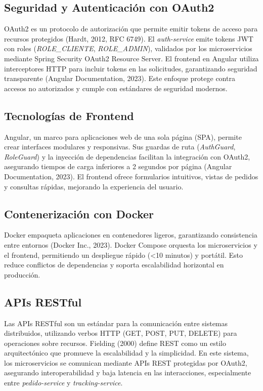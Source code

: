 \documentclass[a4paper,12pt]{article}
\begin{document}
\subsection{Seguridad y Autenticación con OAuth2}
OAuth2 es un protocolo de autorización que permite emitir tokens de acceso para recursos protegidos (Hardt, 2012, RFC 6749). El \textit{auth-service} emite tokens JWT con roles (\textit{ROLE\_CLIENTE}, \textit{ROLE\_ADMIN}), validados por los microservicios mediante Spring Security OAuth2 Resource Server. El frontend en Angular utiliza interceptores HTTP para incluir tokens en las solicitudes, garantizando seguridad transparente (Angular Documentation, 2023). Este enfoque protege contra accesos no autorizados y cumple con estándares de seguridad modernos.

\subsection{Tecnologías de Frontend}
Angular, un marco para aplicaciones web de una sola página (SPA), permite crear interfaces modulares y responsivas. Sus guardas de ruta (\textit{AuthGuard}, \textit{RoleGuard}) y la inyección de dependencias facilitan la integración con OAuth2, asegurando tiempos de carga inferiores a 2 segundos por página (Angular Documentation, 2023). El frontend ofrece formularios intuitivos, vistas de pedidos y consultas rápidas, mejorando la experiencia del usuario.

\subsection{Contenerización con Docker}
Docker empaqueta aplicaciones en contenedores ligeros, garantizando consistencia entre entornos (Docker Inc., 2023). Docker Compose orquesta los microservicios y el frontend, permitiendo un despliegue rápido (<10 minutos) y portátil. Esto reduce conflictos de dependencias y soporta escalabilidad horizontal en producción.

\subsection{APIs RESTful}
Las APIs RESTful son un estándar para la comunicación entre sistemas distribuidos, utilizando verbos HTTP (GET, POST, PUT, DELETE) para operaciones sobre recursos. Fielding (2000) define REST como un estilo arquitectónico que promueve la escalabilidad y la simplicidad. En este sistema, los microservicios se comunican mediante APIs REST protegidas por OAuth2, asegurando interoperabilidad y baja latencia en las interacciones, especialmente entre \textit{pedido-service} y \textit{tracking-service}.
\end{document}
